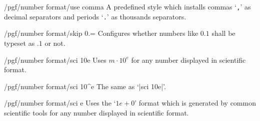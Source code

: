 \begin{key}{/pgf/number format/use comma}
A predefined style which installs commas `\texttt{,}' as decimal separators and periods `\texttt{.}' as thousands separators.

\begin{codeexample}[]
\end{codeexample}
\begin{codeexample}[]
\end{codeexample}
\end{key}

\begin{key}{/pgf/number format/skip 0.=}
	Configures whether numbers like $0.1$ shall be typeset as $.1$ or not.
\begin{codeexample}[]
\end{codeexample}
\begin{codeexample}[]
\end{codeexample}
\end{key}

\begin{key}{/pgf/number format/sci 10e}
Uses $m \cdot 10^e$ for any number displayed in scientific format.

\begin{codeexample}[]
\end{codeexample}
\end{key}

\begin{key}{/pgf/number format/sci 10\textasciicircum e}
The same as `|sci 10e|'.
\end{key}

\begin{key}{/pgf/number format/sci e}
Uses the `$1e{+}0$' format which is generated by common scientific tools for any number displayed in scientific format.

\begin{codeexample}[]
\end{codeexample}
\end{key}


